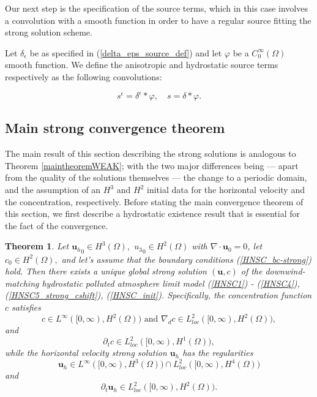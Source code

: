 \documentclass[11pt]{article}
\newtheorem{theorem}{Theorem}
\begin{document}
Our next step is the specification of the source terms, which in this case involves a convolution with a smooth function in order to have a regular source fitting the strong solution scheme.

Let $\delta_\epsilon$ be as specified in (\ref{delta_eps_source_def}) and let $\varphi$ be a $C^\infty_0 (\Omega)$ smooth function. We define the anisotropic and hydrostatic source terms respectively as the following convolutions:

\begin{equation} \label{sourcetermdefinitionstrong} s^\epsilon = \delta^\epsilon \ast \varphi, \quad s = \delta \ast \varphi.\end{equation}

\subsection{Main strong convergence theorem}

The main result of this section describing the strong solutions is analogous to Theorem \ref{maintheoremWEAK}; with the two major differences being --- apart from the quality of the solutions themselves --- the change to a periodic domain, and the assumption of an $H^3$ and $H^2$ initial data for the horizontal velocity and the concentration, respectively. Before stating the main convergence theorem of this section, we first describe a hydrostatic existence result that is essential for the fact of the convergence.

\begin{theorem} \label{existenceconcentrationSTRONG}
Let ${\mathbf{u}_h}_0 \in H^3(\Omega),$ ${u_3}_0 \in H^2(\Omega)$ with $\nabla \cdot \mathbf{u}_0 = 0$, let $c_0 \in H^2 (\Omega),$ and let's assume that the boundary conditions (\ref{HNSC_bc-strong}) hold. Then there exists a unique global strong solution $(\mathbf{u}, c)$ of the downwind-matching hydrostatic polluted atmosphere limit model (\ref{HNSC1}) - (\ref{HNSC4}), (\ref{HNSC5_strong_cshift}), (\ref{HNSC_init}). Specifically, the concentration function $c$ satisfies
%
\begin{equation} \label{regularity_c_first}
c \in L^\infty([0, \infty), H^2(\Omega)) \text{ and } \nabla_d c \in L^2_{loc}([0, \infty), H^2(\Omega)),
\end{equation}
%
and
%
\begin{equation}
\partial_t c \in L^2_{loc}([0, \infty), H^1(\Omega)),
\end{equation}
%
while the horizontal velocity strong solution $\mathbf{u}_h$ has the regularities
%
\begin{equation} \label{u_regularities_first}
\mathbf{u}_h \in L^\infty([0, \infty), H^3(\Omega)) \cap L^2_{loc}([0, \infty), H^4(\Omega))
\end{equation}
%
and
%
\begin{equation} \label{u_regularities_second}
\partial_t \mathbf{u}_h \in L^2_{loc}([0, \infty), H^2(\Omega)).
\end{equation}
%
\end{theorem}
\end{document}

